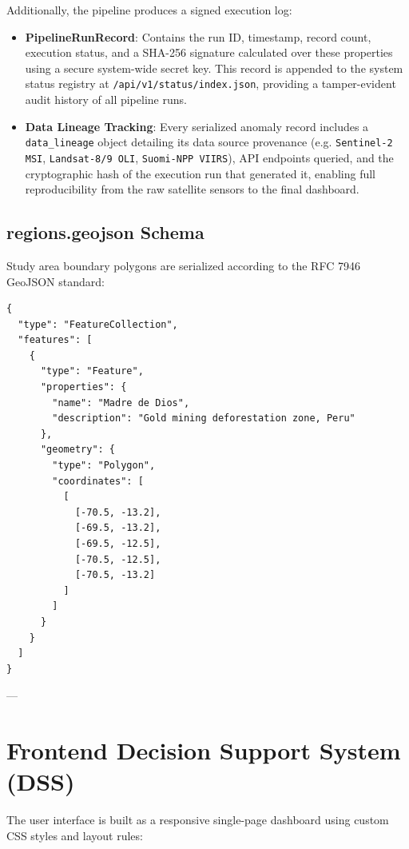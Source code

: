 Additionally, the pipeline produces a signed execution log:
\begin{itemize}
  \item \textbf{PipelineRunRecord}: Contains the run ID, timestamp, record count, execution status, and a SHA-256 signature calculated over these properties using a secure system-wide secret key. This record is appended to the system status registry at \texttt{/api/v1/status/index.json}, providing a tamper-evident audit history of all pipeline runs.
  \item \textbf{Data Lineage Tracking}: Every serialized anomaly record includes a \texttt{data\_lineage} object detailing its data source provenance (e.g. \texttt{Sentinel-2 MSI}, \texttt{Landsat-8/9 OLI}, \texttt{Suomi-NPP VIIRS}), API endpoints queried, and the cryptographic hash of the execution run that generated it, enabling full reproducibility from the raw satellite sensors to the final dashboard.

\end{itemize}
\subsection{regions.geojson Schema}
Study area boundary polygons are serialized according to the RFC 7946 GeoJSON standard:
\begin{verbatim}
{
  "type": "FeatureCollection",
  "features": [
    {
      "type": "Feature",
      "properties": {
        "name": "Madre de Dios",
        "description": "Gold mining deforestation zone, Peru"
      },
      "geometry": {
        "type": "Polygon",
        "coordinates": [
          [
            [-70.5, -13.2],
            [-69.5, -13.2],
            [-69.5, -12.5],
            [-70.5, -12.5],
            [-70.5, -13.2]
          ]
        ]
      }
    }
  ]
}
\end{verbatim}

---

\section{Frontend Decision Support System (DSS)}
The user interface is built as a responsive single-page dashboard using custom CSS styles and layout rules:

